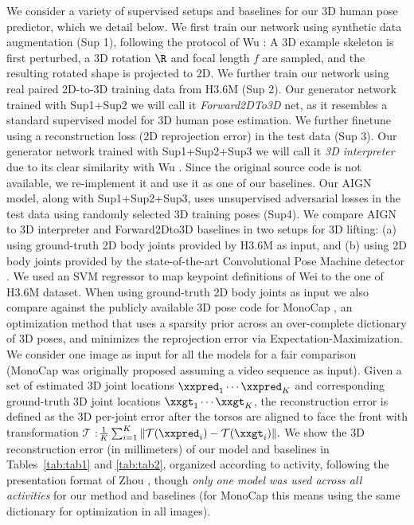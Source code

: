 \documentclass[10pt,twocolumn,letterpaper]{article}
\newcommand\todo[1]{\textcolor{red}{#1}}
\begin{document}
\begin{bibunit}[ieee]
We consider a variety of supervised setups and baselines for our 3D human pose predictor, which we detail below. 
We first train our network using synthetic data augmentation (Sup 1), following the protocol of Wu \etal\cite{Wu2016}: A 3D example skeleton is first perturbed,  a 3D rotation $\R$ and focal length $f$ are sampled, and the resulting rotated shape is projected to 2D. 
We further train our network using real paired 2D-to-3D training data from H3.6M  (Sup 2). Our generator network trained with Sup1+Sup2 we will call it \textit{Forward2DTo3D} net, 
 as it resembles a standard supervised model for 3D human pose estimation.  
We further 
finetune using a reconstruction loss (2D reprojection error) in the test data (Sup 3). Our generator network trained with Sup1+Sup2+Sup3 we will call it \textit{3D interpreter} due to its clear similarity with Wu \etal\cite{Wu2016}. Since the original source code is not available, we re-implement it and use it as one of our baselines. 
Our AIGN model, along with Sup1+Sup2+Sup3, uses unsupervised adversarial losses in the test data using randomly selected 3D  training poses (Sup4). 
We compare AIGN to 3D interpreter and Forward2Dto3D baselines in two setups for 3D lifting: (a) using ground-truth 2D body joints provided by H3.6M as input, and (b) using 2D body joints provided by the state-of-the-art Convolutional Pose Machine detector \cite{wei2016cpm}. We used an SVM regressor to map keypoint definitions  of Wei \etal\cite{wei2016cpm} to the one of H3.6M dataset.  When using ground-truth 2D body joints as input we also compare against the publicly available 3D pose code for  MonoCap \cite{DBLP:journals/corr/ZhouZPLDD17}, an optimization method that uses  a sparsity prior across an over-complete dictionary of 3D poses, and minimizes the reprojection error via Expectation-Maximization. We consider one image as input for all the models for a fair comparison (MonoCap was originally proposed assuming a video sequence as input). %
Given a set of estimated 3D joint locations $\xxpred_1 \cdots \xxpred_K$ and  corresponding ground-truth 3D joint locations $\xxgt_1 \cdots \xxgt_K$, 
the reconstruction error is defined as the 3D per-joint
error after the torsos are aligned to face the front with transformation $\mathcal{T}$
:$\frac{1}{K}\sum_{i=1}^K \| \mathcal{T}(\xxpred_i)- \mathcal{T}(\xxgt_i) \|.$%
We show the 3D reconstruction error (in millimeters) of our model and baselines in Tables~\ref{tab:tab1} and \ref{tab:tab2}, organized according to activity, following the presentation format of Zhou \etal\cite{DBLP:journals/corr/ZhouZPLDD17}, though \textit{only one model was used across all activities} for our method and baselines (for MonoCap this means using the same dictionary for optimization in all images).   


\end{bibunit}
\end{document}
